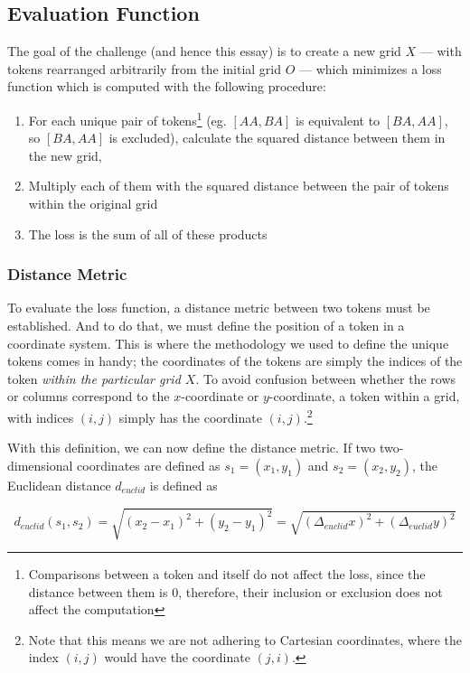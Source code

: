 \subsection{Evaluation Function}%
\label{sub:evaluation_function}

The goal of the challenge (and hence this essay) is to create a new grid $X$ --- with tokens rearranged arbitrarily from the initial grid $O$ --- which minimizes a loss function which is computed with the following procedure:
\begin{enumerate}
    \item For each unique pair of tokens\footnote{Comparisons between a token and itself do not affect the loss, since the distance between them is $0$, therefore, their inclusion or exclusion does not affect the computation} (eg. $[AA,BA]$ is equivalent to $[BA,AA]$, so $[BA,AA]$ is excluded), calculate the squared distance between them in the new grid,
    \item Multiply each of them with the squared distance between the pair of tokens within the original grid
    \item The loss is the sum of all of these products
\end{enumerate}

\subsubsection{Distance Metric}%
\label{ssub:distance_metric}
To evaluate the loss function, a distance metric between two tokens must be established. And to do that, we must define the position of a token in a coordinate system. This is where the methodology we used to define the unique tokens comes in handy; the coordinates of the tokens are simply the indices of the token \emph{within the particular grid $X$}. To avoid confusion between whether the rows or columns correspond to the $x$-coordinate or $y$-coordinate, a token within a grid, with indices $(i,j)$ simply has the coordinate $(i,j)$.\footnote{Note that this means we are not adhering to Cartesian coordinates, where the index $(i,j)$ would have the coordinate $(j,i)$.}

With this definition, we can now define the distance metric. If two two-dimensional coordinates are defined as $s_1=(x_1,y_1)$ and $s_2=(x_2,y_2)$, the Euclidean distance $d_{euclid}$ is defined as

\begin{equation}
    \label{eq:euclid}
    d_{euclid}(s_1,s_2)=\sqrt{(x_2-x_1)^2+(y_2-y_1)^2}=\sqrt{(\Delta_{euclid} x)^2+(\Delta_{euclid} y)^2}
\end{equation}

